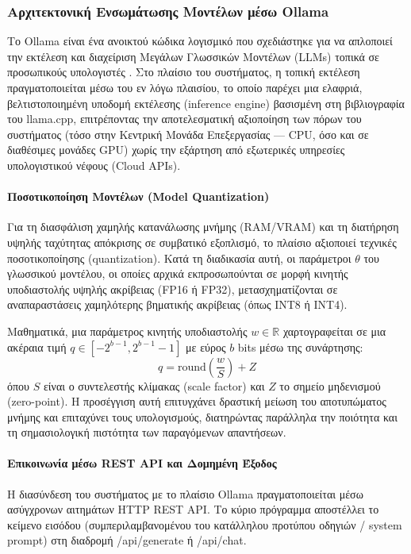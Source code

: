 \documentclass[twoside, a4paper, 11pt]{article}
\newcommand{\textlatin}[1]{\textenglish{#1}}
\begin{document}
\subsubsection{Αρχιτεκτονική Ενσωμάτωσης Μοντέλων μέσω Ollama}

Το \textlatin{Ollama} είναι ένα ανοικτού κώδικα λογισμικό που σχεδιάστηκε για να απλοποιεί την εκτέλεση και διαχείριση Μεγάλων Γλωσσικών Μοντέλων (\textlatin{LLMs}) τοπικά σε προσωπικούς υπολογιστές \cite{ollama2023}. Στο πλαίσιο του συστήματος, η τοπική εκτέλεση πραγματοποιείται μέσω του εν λόγω πλαισίου, το οποίο παρέχει μια ελαφριά, βελτιστοποιημένη υποδομή εκτέλεσης (\textlatin{inference engine}) βασισμένη στη βιβλιογραφία του \textlatin{llama.cpp}, επιτρέποντας την αποτελεσματική αξιοποίηση των πόρων του συστήματος (τόσο στην Κεντρική Μονάδα Επεξεργασίας — \textlatin{CPU}, όσο και σε διαθέσιμες μονάδες \textlatin{GPU}) χωρίς την εξάρτηση από εξωτερικές υπηρεσίες υπολογιστικού νέφους (\textlatin{Cloud APIs}).

\paragraph{Ποσοτικοποίηση Μοντέλων (\textlatin{Model Quantization})}
Για τη διασφάλιση χαμηλής κατανάλωσης μνήμης (\textlatin{RAM/VRAM}) και τη διατήρηση υψηλής ταχύτητας απόκρισης σε συμβατικό εξοπλισμό, το πλαίσιο αξιοποιεί τεχνικές ποσοτικοποίησης (\textlatin{quantization}). Κατά τη διαδικασία αυτή, οι παράμετροι $\theta$ του γλωσσικού μοντέλου, οι οποίες αρχικά εκπροσωπούνται σε μορφή κινητής υποδιαστολής υψηλής ακρίβειας (\textlatin{FP16} ή \textlatin{FP32}), μετασχηματίζονται σε αναπαραστάσεις χαμηλότερης βηματικής ακρίβειας (όπως \textlatin{INT8} ή \textlatin{INT4}).

Μαθηματικά, μια παράμετρος κινητής υποδιαστολής $w \in \mathbb{R}$ χαρτογραφείται σε μια ακέραια τιμή $q \in [-2^{b-1}, 2^{b-1}-1]$ με εύρος $b$ bits μέσω της συνάρτησης:
\begin{equation}
q = \text{round}\left( \frac{w}{S} \right) + Z
\end{equation}
όπου $S$ είναι ο συντελεστής κλίμακας (\textlatin{scale factor}) και $Z$ το σημείο μηδενισμού (\textlatin{zero-point}). Η προσέγγιση αυτή επιτυγχάνει δραστική μείωση του αποτυπώματος μνήμης και επιταχύνει τους υπολογισμούς, διατηρώντας παράλληλα την ποιότητα και τη σημασιολογική πιστότητα των παραγόμενων απαντήσεων.

\paragraph{Επικοινωνία μέσω \textlatin{REST API} και Δομημένη Έξοδος}
Η διασύνδεση του συστήματος με το πλαίσιο \textlatin{Ollama} πραγματοποιείται μέσω ασύγχρονων αιτημάτων \textlatin{HTTP REST API}. Το κύριο πρόγραμμα αποστέλλει το κείμενο εισόδου (συμπεριλαμβανομένου του κατάλληλου προτύπου οδηγιών / \textlatin{system prompt}) στη διαδρομή \textlatin{/api/generate} ή \textlatin{/api/chat}.
\end{document}
